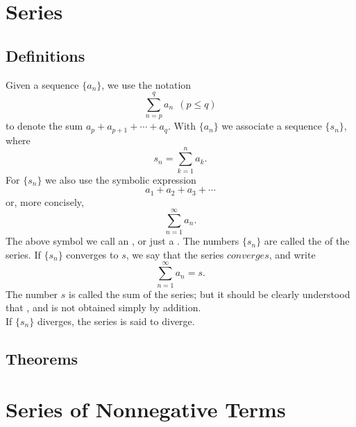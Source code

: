 \section{Series}
\subsection{Definitions}
\begin{definition}
	Given a sequence $\{a_n\}$, we use the notation $$\sum^q_{n=p} a_n ~~(p\leq q)$$ to denote the sum $a_p+a_{p+1}+\cdots+a_q$. With $\{a_n\}$ we associate a sequence $\{s_n\}$, where $$s_n=\sum_{k=1}^n a_k.$$
	For $\{s_n\}$ we also use the symbolic expression $$a_1+a_2+a_3+\cdots$$ or, more concisely, $$\sum_{n=1}^\infty a_n.$$ The above symbol we call an {}, or just a {}. The numbers $\{s_n\}$ are called the {} of the series. If $\{s_n\}$ converges to $s$, we say that the series $converges$, and write $$\sum_{n=1}^\infty a_n =s.$$ The number $s$ is called the sum of the series; but it should be clearly understood that {}, and is not obtained simply by addition.\\
	If $\{s_n\}$ diverges, the series is said to diverge.
\end{definition}

\subsection{Theorems}




\section{Series of Nonnegative Terms}
